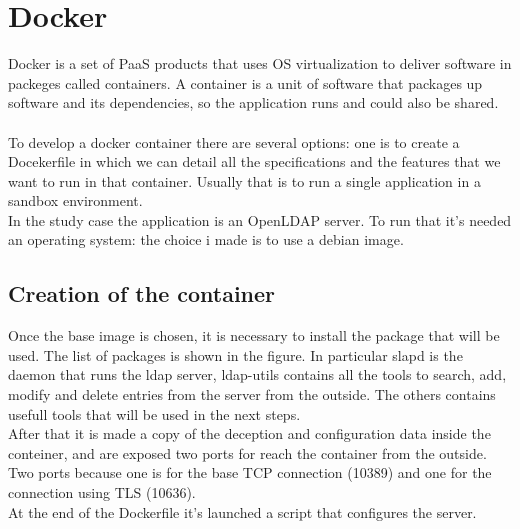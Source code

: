 \chapter{Docker}
Docker \cite{docker} is a set of PaaS products that uses OS virtualization to deliver software in packeges called containers. A container is a unit of software that packages up software and its dependencies, so the application runs and could also be shared. 
\\\\
To develop a docker container there are several options: one is to create a Docekerfile in which we can detail all the specifications and the features that we want to run in that container. Usually that is to run a single application in a sandbox environment.  
\\
In the study case the application is an OpenLDAP server. To run that it’s needed an operating system: the choice i made is to use a debian image.
\section{Creation of the container}
\begin{mdframed}[backgroundcolor=back]

\end{mdframed}
Once the base image is chosen, it is necessary to install the package that will be used. The list of packages is shown in the figure. In particular slapd is the daemon that runs the ldap server, ldap-utils contains all the tools to search, add, modify and delete entries from the server from the outside. The others contains usefull tools that will be used in the next steps.  
\\
After that it is made a copy of the deception and configuration data inside the conteiner, and are exposed two ports for reach the container from the outside. Two ports because one is for the base TCP connection (10389) and one for the connection using TLS (10636). 
\\
At the end of the Dockerfile it’s launched a script that configures the server.
